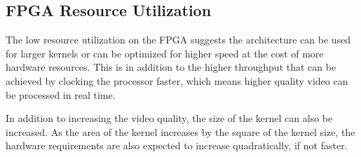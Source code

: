 \subsection{FPGA Resource Utilization}
The low resource utilization on the FPGA suggests the architecture can be used for larger kernels or can be optimized for higher speed at the cost of more hardware resources.
This is in addition to the higher throughput that can be achieved by clocking the processor faster, which means higher quality video can be processed in real time.

In addition to increasing the video quality, the size of the kernel can also be increased.
As the area of the kernel increases by the square of the kernel size,
the hardware requirements are also expected to increase quadratically,
if not faster.
